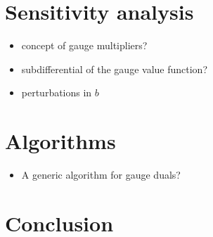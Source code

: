 \documentclass{siamltex}   %
\begin{document}
  \section{Sensitivity analysis}
  \begin{itemize}
  \item concept of gauge multipliers?
  \item subdifferential of the gauge value function?
  \item perturbations in $b$
  \end{itemize}

  \section{Algorithms}
  \label{sec:algorithms}

  \begin{itemize}
  \item A generic algorithm for gauge duals?
  \end{itemize}
  

  

  \section{Conclusion}


  
  
\end{document}
